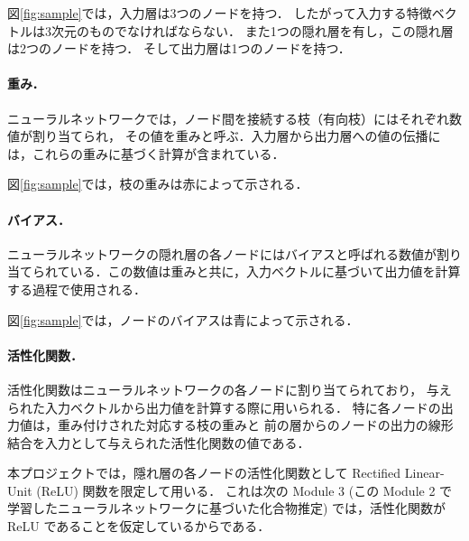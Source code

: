 \documentclass[11pt, titlepage, dvipdfmx, twoside]{jarticle}
\newcommand{\figref}[1]{図\ref{fig:#1}}
\begin{document}
\figref{sample}では，入力層は3つのノードを持つ．
したがって入力する特徴ベクトルは3次元のものでなければならない．
また1つの隠れ層を有し，この隠れ層は2つのノードを持つ．
そして出力層は1つのノードを持つ．

\paragraph{重み．}
ニューラルネットワークでは，ノード間を接続する枝（有向枝）にはそれぞれ数値が割り当てられ，
その値を重みと呼ぶ．入力層から出力層への値の伝播には，これらの重みに基づく計算が含まれている．

\figref{sample}では，枝の重みは赤によって示される．


\paragraph{バイアス．}
ニューラルネットワークの隠れ層の各ノードにはバイアスと呼ばれる数値が割り当てられている．この数値は重みと共に，入力ベクトルに基づいて出力値を計算する過程で使用される．

\figref{sample}では，ノードのバイアスは青によって示される．

\paragraph{活性化関数．}
活性化関数はニューラルネットワークの各ノードに割り当てられており，
与えられた入力ベクトルから出力値を計算する際に用いられる．
特に各ノードの出力値は，重み付けされた対応する枝の重みと
前の層からのノードの出力の線形結合を入力として与えられた活性化関数の値である．

本プロジェクトでは，隱れ層の各ノードの活性化関数として
Rectified Linear-Unit (ReLU) 関数を限定して用いる．
これは次の Module 3 (この Module 2 で学習したニューラルネットワークに基づいた化合物推定)
では，活性化関数が ReLU であることを仮定しているからである． 

\medskip

\end{document}
